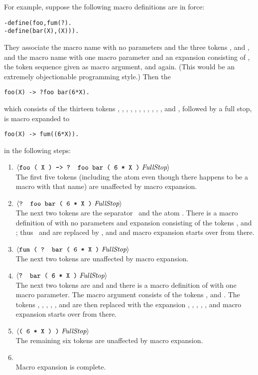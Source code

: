 For example, suppose the following macro definitions are in force:
\begin{verbatim}
-define(foo,fum(?).
-define(bar(X),(X))).
\end{verbatim}
They associate the macro name  with no parameters and the three tokens ,
\T{(} and , and the macro name  with one macro parameter  and an
expansion consisting of \T{(}, the token sequence given as macro argument, \T{)} and \T{)} again.
(This would be an extremely objectionable programming style.)
Then the 
\begin{verbatim}
foo(X) -> ?foo bar(6*X).
\end{verbatim}
which consists of the thirteen tokens , \T{(}, , \T{)}, \T{->},
, , , \T{(}, , \T{*},  and \T{)},
followed by a full stop, is macro expanded to
\begin{verbatim}
foo(X) -> fum((6*X)).
\end{verbatim}
in the following steps:
\begin{enumerate}
\item $\langle\text{{\tt foo ( X ) -> ? foo bar ( 6 * X )} {\it FullStop}}\rangle$ \\
The first five tokens (including the atom  even though there happens to be a macro
with that name) are unaffected by macro expansion.
\item {} $\langle\text{{\tt? foo bar ( 6 * X )} {\it FullStop}}\rangle$ \\
The next two tokens are the separator \ and the atom .  There is a macro definition
of  with no parameters and expansion consisting of the tokens ,
\T{(} and ; thus \ and  are replaced by , \T{(} and 
and macro expansion starts over from there.
\item {} $\langle\text{{\tt fum ( ? bar ( 6 * X )} {\it FullStop}}\rangle$ \\
The next two tokens are unaffected by macro expansion.
\item {} $\langle\text{{\tt? bar ( 6 * X )} {\it FullStop}}\rangle$ \\
The next two tokens are  and  and there is a macro definition of  with
one macro parameter. The macro argument consists of the tokens , \T{*} and .
The tokens , , \T{(}, , \T{*},  and \T{)} are then replaced with the
expansion \T{(}, , \T{*}, , \T{)}, \T{)} and macro expansion starts over from there.
\item {} $\langle\text{{\tt( 6 * X ) )} {\it FullStop}}\rangle$ \\
The remaining six tokens are unaffected by macro expansion.
\item {}  \\
Macro expansion is complete.
\end{enumerate}

